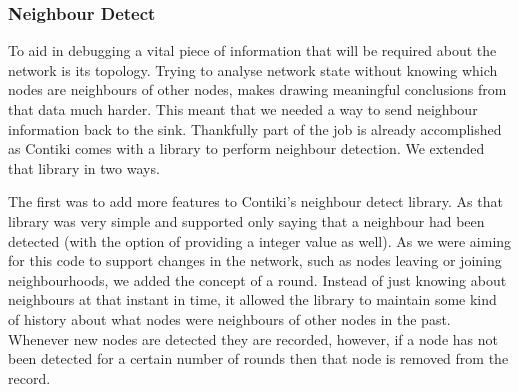 \begin{figure}[H]
\centering
{}
\end{figure}

\subsubsection{Neighbour Detect}

To aid in debugging a vital piece of information that will be required about the network is its topology. Trying to analyse network state without knowing which nodes are neighbours of other nodes, makes drawing meaningful conclusions from that data much harder. This meant that we needed a way to send neighbour information back to the sink. Thankfully part of the job is already accomplished as Contiki comes with a library to perform neighbour detection\cite{?}. We extended that library in two ways.

The first was to add more features to Contiki's neighbour detect library. As that library was very simple and supported only saying that a neighbour had been detected (with the option of providing a integer value as well). As we were aiming for this code to support changes in the network, such as nodes leaving or joining neighbourhoods, we added the concept of a round. Instead of just knowing about neighbours at that instant in time, it allowed the library to maintain some kind of history about what nodes were neighbours of other nodes in the past. Whenever new nodes are detected they are recorded, however, if a node has not been detected for a certain number of rounds then that node is removed from the record.

